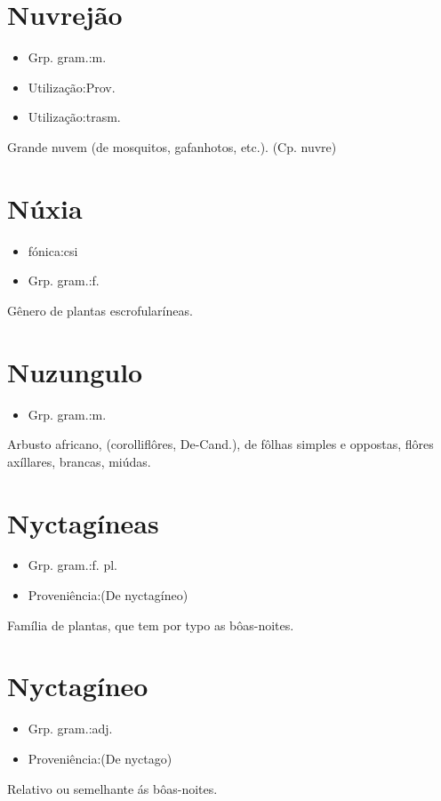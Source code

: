 \section{Nuvrejão}
\begin{itemize}
\item {Grp. gram.:m.}
\end{itemize}
\begin{itemize}
\item {Utilização:Prov.}
\end{itemize}
\begin{itemize}
\item {Utilização:trasm.}
\end{itemize}
Grande nuvem (de mosquitos, gafanhotos, etc.).
(Cp. \textunderscore nuvre\textunderscore )
\section{Núxia}
\begin{itemize}
\item {fónica:csi}
\end{itemize}
\begin{itemize}
\item {Grp. gram.:f.}
\end{itemize}
Gênero de plantas escrofularíneas.
\section{Nuzungulo}
\begin{itemize}
\item {Grp. gram.:m.}
\end{itemize}
Arbusto africano, (\textunderscore corolliflôres\textunderscore , De-Cand.), de fôlhas simples e oppostas, flôres axíllares, brancas, miúdas.
\section{Nyctagíneas}
\begin{itemize}
\item {Grp. gram.:f. pl.}
\end{itemize}
\begin{itemize}
\item {Proveniência:(De \textunderscore nyctagíneo\textunderscore )}
\end{itemize}
Família de plantas, que tem por typo as bôas-noites.
\section{Nyctagíneo}
\begin{itemize}
\item {Grp. gram.:adj.}
\end{itemize}
\begin{itemize}
\item {Proveniência:(De \textunderscore nyctago\textunderscore )}
\end{itemize}
Relativo ou semelhante ás bôas-noites.
